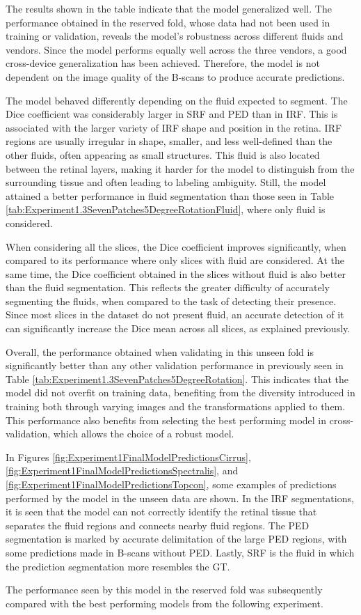 The results shown in the table indicate that the model generalized well. The performance obtained in the reserved fold, whose data had not been used in training or validation, reveals the model's robustness across different fluids and vendors. Since the model performs equally well across the three vendors, a good cross-device generalization has been achieved. Therefore, the model is not dependent on the image quality of the B-scans to produce accurate predictions.
\par
The model behaved differently depending on the fluid expected to segment. The Dice coefficient was considerably larger in SRF and PED than in IRF. This is associated with the larger variety of IRF shape and position in the retina. IRF regions are usually irregular in shape, smaller, and less well-defined than the other fluids, often appearing as small structures. This fluid is also located between the retinal layers, making it harder for the model to distinguish from the surrounding tissue and often leading to labeling ambiguity. Still, the model attained a better performance in fluid segmentation than those seen in Table \ref{tab:Experiment1.3SevenPatches5DegreeRotationFluid}, where only fluid is considered.
\par
When considering all the slices, the Dice coefficient improves significantly, when compared to its performance where only slices with fluid are considered. At the same time, the Dice coefficient obtained in the slices without fluid is also better than the fluid segmentation. This reflects the greater difficulty of accurately segmenting the fluids, when compared to the task of detecting their presence. Since most slices in the dataset do not present fluid, an accurate detection of it can significantly increase the Dice mean across all slices, as explained previously.
\par
Overall, the performance obtained when validating in this unseen fold is significantly better than any other validation performance in previously seen in Table \ref{tab:Experiment1.3SevenPatches5DegreeRotation}. This indicates that the model did not overfit on training data, benefiting from the diversity introduced in training both through varying images and the transformations applied to them. This performance also benefits from selecting the best performing model in cross-validation, which allows the choice of a robust model. 
\par
In Figures \ref{fig:Experiment1FinalModelPredictionsCirrus}, \ref{fig:Experiment1FinalModelPredictionsSpectralis}, and \ref{fig:Experiment1FinalModelPredictionsTopcon}, some examples of predictions performed by the model in the unseen data are shown. In the IRF segmentations, it is seen that the model can not correctly identify the retinal tissue that separates the fluid regions and connects nearby fluid regions. The PED segmentation is marked by accurate delimitation of the large PED regions, with some predictions made in B-scans without PED. Lastly, SRF is the fluid in which the prediction segmentation more resembles the GT.
\par
The performance seen by this model in the reserved fold was subsequently compared with the best performing models from the following experiment.

